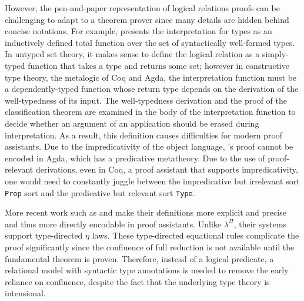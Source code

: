 \documentclass[\ifpublic nolinenum\else\fi,online,OA]{jfp}
\newcommand{\scw}[1]{}
\newcommand{\yl}[1]{}
\newcommand{\lang}{$\lambda^{\Pi}$\xspace}
\theoremstyle{definition}
\begin{document}
However, the pen-and-paper representation of logical relations proofs
can be challenging to adapt to a theorem prover since many details
are hidden behind concise notations.
For example, \citet{geuvers1994short} presents the interpretation for types as
an inductively defined total function over the set of syntactically
well-formed types. \scw{The issue is that Geuver's metalogic is (untyped) set
theory, but Coq and Agda use type theory.}
In untyped set theory, it makes sense to define the logical relation as a
simply-typed function that takes a type and returns some set; however
in constructive type theory, the metalogic of Coq and Agda, the
interpretation function must be a dependently-typed function whose
return type depends on the derivation of the well-typedness of its
input. The well-typedness derivation and the proof of the
classification theorem\scw{what is the classification theorem}\yl{It
  says all well-formed terms A (either G |- A : .. or G |- .. : A)
then A is either an object, a type, or a kind. The classification is
used to guide erasure}
are examined in the body
of the interpretation function to decide whether an argument of an
application should be erased during interpretation. As a result, this
definition causes difficulties for modern proof assistants.
Due to the
impredicativity of the object language, \citet{geuvers1994short}'s
proof cannot be encoded in Agda, which has a predicative
metatheory. Due to the use of proof-relevant derivations, even in
Coq, a proof assistant that supports impredicativity, one would need
to constantly juggle between the impredicative but irrelevant sort
\texttt{Prop} sort and the predicative but relevant sort
\texttt{Type}.

More recent work such as \citet{Abel12}
and \citet{abel2008betaeta} make their definitions more explicit and
precise and thus more directly encodable in proof assistants.
Unlike \lang, their systems support type-directed $\eta$ laws. These
type-directed equational rules complicate the proof significantly
since the confluence of full reduction is not available until the
fundamental theorem is proven. Therefore,
instead of a logical predicate, a relational model with
syntactic type annotations is needed to remove the early reliance on
confluence, despite the fact that the underlying type theory is
intensional.
\end{document}
